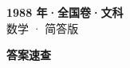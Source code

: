 \documentclass[zihao=-4, a4paper]{ctexart}
\begin{document}
\begin{center}
  {\Large\bfseries 1988 年·全国卷·文科}\\[4pt]
  {\large 数学 · 简答版}
\end{center}
\medskip
{}

\clearpage
{}
\begin{center}{\Large\bfseries 答案速查}\end{center}
\medskip

\end{document}
